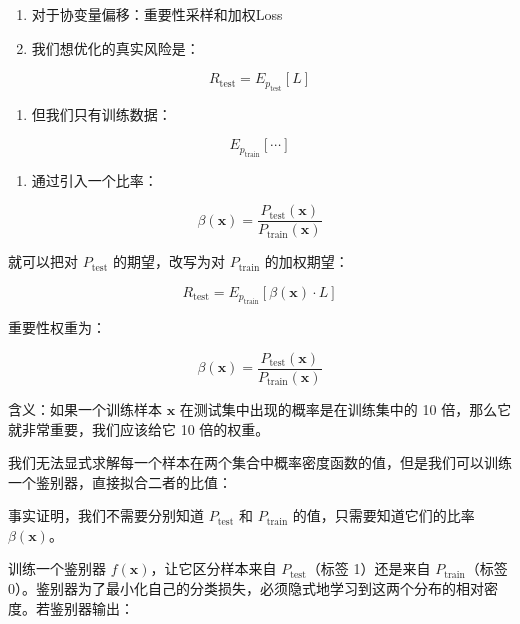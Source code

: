 \begin{enumerate}
\def\labelenumi{\arabic{enumi}.}
\item
  对于协变量偏移：重要性采样和加权Loss
\item
{}
  我们想优化的真实风险是：
\end{enumerate}

\[
R_{\mathrm{test}}=E_{p_{\mathrm{test}}}[L]
\]

\begin{enumerate}
\def\labelenumi{\arabic{enumi}.}
\setcounter{enumi}{1}
\tightlist
\item
{}
  但我们只有训练数据：
\end{enumerate}

\[
E_{p_{\mathrm{train}}}[\cdots]
\]

\begin{enumerate}
\def\labelenumi{\arabic{enumi}.}
\setcounter{enumi}{2}
\tightlist
\item
{}
  通过引入一个比率：
\end{enumerate}

\[
\beta(\mathbf{x})=\frac{P_{\mathrm{test}}(\mathbf{x})}{P_{\mathrm{train}}(\mathbf{x})}
\]

就可以把对 \(P_{\mathrm{test}}\) 的期望，改写为对 \(P_{\mathrm{train}}\) 的加权期望：

\[
R_{\mathrm{test}}=E_{p_{\mathrm{train}}}[\beta(\mathbf{x})\cdot L]
\]

重要性权重为：

\[
\beta(\mathbf{x})=\frac{P_{\mathrm{test}}(\mathbf{x})}{P_{\mathrm{train}}(\mathbf{x})}
\]

含义：如果一个训练样本 \(\mathbf{x}\) 在测试集中出现的概率是在训练集中的 10 倍，那么它就非常重要，我们应该给它 10 倍的权重。

我们无法显式求解每一个样本在两个集合中概率密度函数的值，但是我们可以训练一个鉴别器，直接拟合二者的比值：

事实证明，我们不需要分别知道 \(P_{\mathrm{test}}\) 和 \(P_{\mathrm{train}}\) 的值，只需要知道它们的比率 \(\beta(\mathbf{x})\)。

训练一个鉴别器 \(f(\mathbf{x})\)，让它区分样本来自 \(P_{\mathrm{test}}\)（标签 1）还是来自 \(P_{\mathrm{train}}\)（标签 0）。鉴别器为了最小化自己的分类损失，必须隐式地学习到这两个分布的相对密度。若鉴别器输出：

